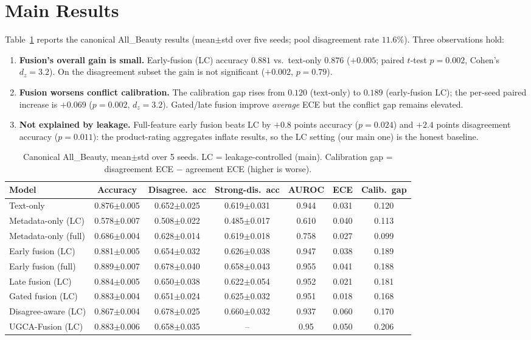 \documentclass[11pt]{article}
\begin{document}
\section{Main Results}\label{sec:main}
Table~\ref{tab:main} reports the canonical All\_Beauty results (mean$\pm$std over
five seeds; pool disagreement rate $11.6\%$). Three observations hold:

\begin{enumerate}
\item \textbf{Fusion's overall gain is small.} Early-fusion (LC) accuracy
$0.881$ vs.\ text-only $0.876$ ($+0.005$; paired $t$-test $p{=}0.002$, Cohen's
$d_z{=}3.2$). On the disagreement subset the gain is not significant
($+0.002$, $p{=}0.79$).
\item \textbf{Fusion worsens conflict calibration.} The calibration gap rises
from $0.120$ (text-only) to $0.189$ (early-fusion LC); the per-seed paired
increase is $+0.069$ ($p{=}0.002$, $d_z{=}3.2$). Gated/late fusion improve
\emph{average} ECE but the conflict gap remains elevated.
\item \textbf{Not explained by leakage.} Full-feature early fusion beats LC by
$+0.8$ points accuracy ($p{=}0.024$) and $+2.4$ points disagreement accuracy
($p{=}0.011$): the product-rating aggregates inflate results, so the LC setting
(our main one) is the honest baseline.
\end{enumerate}

\begin{table}[t]\centering
\caption{Canonical All\_Beauty, mean$\pm$std over 5 seeds. LC = leakage-controlled
(main). Calibration gap = disagreement ECE $-$ agreement ECE (higher is worse).}
\label{tab:main}
\small
\begin{tabular}{lcccccc}
\toprule
Model & Accuracy & Disagree.\ acc & Strong-dis.\ acc & AUROC & ECE & Calib.\ gap\\
\midrule
Text-only            & 0.876$\pm$0.005 & 0.652$\pm$0.025 & 0.619$\pm$0.031 & 0.944 & 0.031 & 0.120\\
Metadata-only (LC)   & 0.578$\pm$0.007 & 0.508$\pm$0.022 & 0.485$\pm$0.017 & 0.610 & 0.040 & 0.113\\
Metadata-only (full) & 0.686$\pm$0.004 & 0.628$\pm$0.014 & 0.619$\pm$0.018 & 0.758 & 0.027 & 0.099\\
Early fusion (LC)    & 0.881$\pm$0.005 & 0.654$\pm$0.032 & 0.626$\pm$0.038 & 0.947 & 0.038 & 0.189\\
Early fusion (full)  & 0.889$\pm$0.007 & 0.678$\pm$0.040 & 0.658$\pm$0.043 & 0.955 & 0.041 & 0.188\\
Late fusion (LC)     & 0.884$\pm$0.005 & 0.650$\pm$0.038 & 0.622$\pm$0.054 & 0.952 & 0.021 & 0.181\\
Gated fusion (LC)    & 0.883$\pm$0.004 & 0.651$\pm$0.024 & 0.625$\pm$0.032 & 0.951 & 0.018 & 0.168\\
Disagree-aware (LC)  & 0.867$\pm$0.004 & 0.678$\pm$0.025 & 0.660$\pm$0.032 & 0.937 & 0.060 & 0.170\\
UGCA-Fusion (LC)     & 0.883$\pm$0.006 & 0.658$\pm$0.035 & --              & 0.95\phantom{0} & 0.050 & 0.206\\
\bottomrule
\end{tabular}
\end{table}
\end{document}
